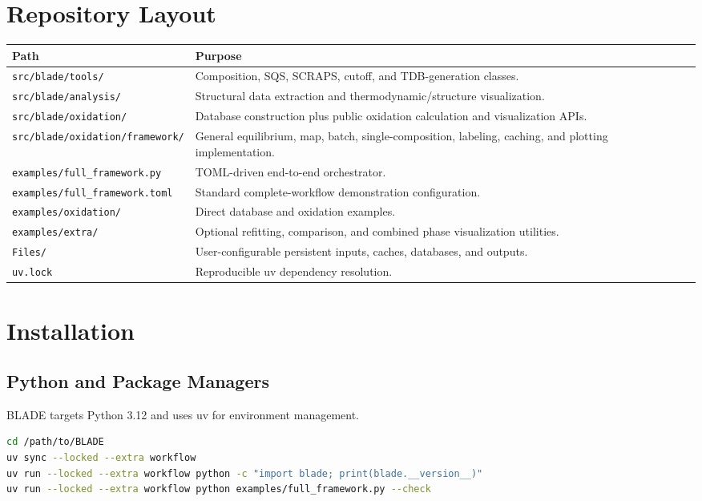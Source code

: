 \documentclass[11pt,letterpaper]{article}
\newcommand{\file}[1]{\nolinkurl{#1}}
\begin{document}
\section{Repository Layout}

\begin{longtable}{p{}p{}}
\toprule
Path & Purpose \\
\midrule
\endhead
\file{src/blade/tools/} & Composition, SQS, SCRAPS, cutoff, and TDB-generation classes. \\
\file{src/blade/analysis/} & Structural data extraction and thermodynamic/structure visualization. \\
\file{src/blade/oxidation/} & Database construction plus public oxidation calculation and visualization APIs. \\
\file{src/blade/oxidation/framework/} & General equilibrium, map, batch, single-composition, labeling, caching, and plotting implementation. \\
\file{examples/full_framework.py} & TOML-driven end-to-end orchestrator. \\
\file{examples/full_framework.toml} & Standard complete-workflow demonstration configuration. \\
\file{examples/oxidation/} & Direct database and oxidation examples. \\
\file{examples/extra/} & Optional refitting, comparison, and combined phase visualization utilities. \\
\file{Files/} & User-configurable persistent inputs, caches, databases, and outputs. \\
\file{uv.lock} & Reproducible uv dependency resolution. \\
\bottomrule
\end{longtable}

\section{Installation}

\subsection{Python and Package Managers}

BLADE targets Python 3.12 and uses uv for environment management.

\begin{lstlisting}[language=bash]
cd /path/to/BLADE
uv sync --locked --extra workflow
uv run --locked --extra workflow python -c "import blade; print(blade.__version__)"
uv run --locked --extra workflow python examples/full_framework.py --check
\end{lstlisting}
\end{document}
